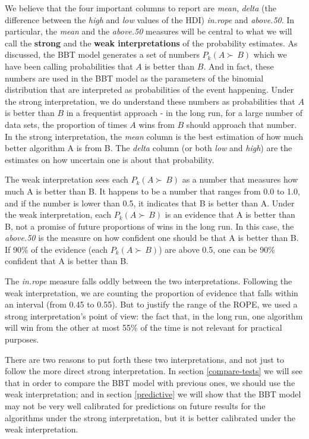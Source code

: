 \documentclass[twoside,11pt,preprint]{article}
\begin{document}
We believe that the four important columns to report are {\em mean},
{\em delta} (the difference between the {\em high} and {\em low} values of the HDI)
{\em in.rope} and {\em above.50}. In particular, the {\em mean} and the {\em above.50}
measures will be central to what we will call the \textbf{strong} and the
\textbf{weak interpretations} of the probability estimates. As discussed, the
BBT model generates a set of numbers \(P_k(A \succ\,B)\) which we have
been calling probabilities that \(A\) is better than \(B\). And in fact,
these numbers are used in the BBT model as the parameters of the
binomial distribution that are interpreted as probabilities of the
event happening. Under the strong interpretation, we do understand
these numbers as probabilities that \(A\) is better than \(B\) in a
frequentist approach - in the long run, for a large number of data
sets, the proportion of times \(A\) wins from \(B\) should approach that
number. In the strong interpretation, the {\em mean} column is the best estimation
of how much better algorithm A is from B. The {\em delta} column (or both
{\em low} and {\em high}) are the estimates on how uncertain one is about that
probability.

The weak interpretation sees each \(P_k(A \succ\,B)\) as a number that
measures how much A is better than B. It happens to be a number that
ranges from 0.0 to 1.0, and if the number is lower than 0.5, it
indicates that B is better than A. Under the weak interpretation, each
\(P_k(A \succ\,B)\) is an evidence that A is better than B, not a
promise of future proportions of wins in the long run. In this case,
the {\em above.50} is the measure on how confident one should be that A is
better than B. If 90\% of the evidence (each \(P_k(A \succ\,B)\)) are
above 0.5, one can be 90\% confident that A is better than B.

The {\em in.rope} measure falls oddly between the two
interpretations. Following the weak interpretation, we are counting
the proportion of evidence that falls within an interval (from 0.45 to
0.55). But to justify the range of the ROPE, we used a strong
interpretation's point of view: the fact that, in the long run, one
algorithm will win from the other at most 55\% of the time is not
relevant for practical purposes.

There are two reasons to put forth these two interpretations, and not
just to follow the more direct strong interpretation. In section
\ref{compare-tests} we will see that in order to compare the BBT model
with previous ones, we should use the weak interpretation; and in
section \ref{predictive} we will show that the BBT model
may not be very well calibrated for predictions on future results for the
algorithms under the strong interpretation, but it is better calibrated under the weak interpretation.
\end{document}
